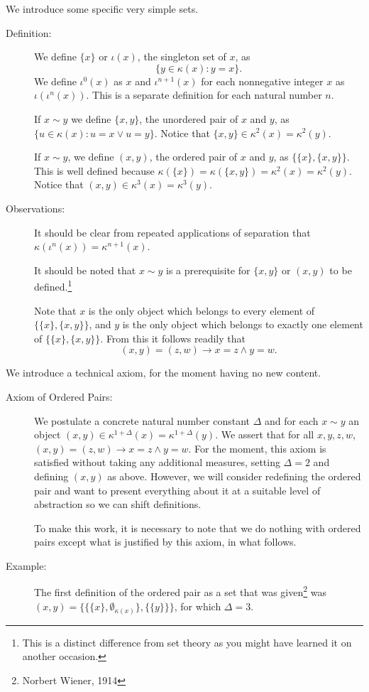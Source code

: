 \documentclass[12pt]{article}
\begin{document}
We introduce some specific very simple sets.

\begin{description}

\item[Definition:]  We define $\{x\}$ or $\iota(x)$, the singleton set of $x$, as $$\{y \in \kappa(x):y=x\}.$$  We define $\iota^0(x)$ 
as $x$ and $\iota^{n+1}(x)$ for each nonnegative integer $x$ as $\iota(\iota^n(x))$.  This is a separate definition for each natural number $n$.

If $x \sim y$ we define $\{x,y\}$, the unordered pair of $x$ and $y$, as \newline $\{u \in \kappa(x):u = x \vee u = y\}$.  Notice
that $\{x,y\} \in \kappa^2(x)=\kappa^2(y)$.

If $x\sim y$, we define $(x,y)$, the ordered pair of $x$ and $y$, as $\{\{x\},\{x,y\}\}$.  This is well defined because $\kappa(\{x\}) = \kappa(\{x,y\}) = \kappa^2(x) = \kappa^2(y)$.  Notice that $(x,y) \in \kappa^3(x) = \kappa^3(y)$.

\item[Observations:]  It should be clear from repeated applications of separation that $\kappa(\iota^n(x)) = \kappa^{n+1}(x)$.

It should be noted that $x \sim y$ is a prerequisite for $\{x,y\}$ or $(x,y)$ to be defined.\footnote{This is a distinct difference from set theory as you might have learned it on another occasion.}

Note that $x$ is the only object which belongs to every element of $\{\{x\},\{x,y\}\}$, and $y$ is the only object which belongs to exactly one element of $\{\{x\},\{x,y\}\}$.  From this it follows readily that $$(x,y)=(z,w) \rightarrow x=z \wedge y=w.$$

\end{description}

We introduce a technical axiom, for the moment having no new content.

\begin{description}

\item[Axiom of Ordered Pairs:]  We postulate a concrete natural number constant $\Delta$ and
for each $x \sim y$ an object $(x,y) \in \kappa^{1+\Delta}(x) = \kappa^{1+\Delta}(y)$.  We assert that for all $x,y,z,w$, $(x,y)=(z,w) \rightarrow x=z \wedge y = w$.  For the moment,
this axiom is satisfied without taking any additional measures, setting $\Delta=2$ and defining $(x,y)$ as above.   However, we will consider redefining the ordered pair and want to present everything about it at a suitable level of abstraction so we can shift definitions.

To make this work, it is necessary to note that we do nothing with ordered pairs except what is justified by this axiom, in what follows.

\item[Example:]  The first definition of the ordered pair as a set that was given\footnote{Norbert Wiener, 1914} was $(x,y)=\{\{\{x\},\emptyset_{\kappa(x)}\},\{\{y\}\}\}$, for which $\Delta=3$.

\end{description}
\end{document}
